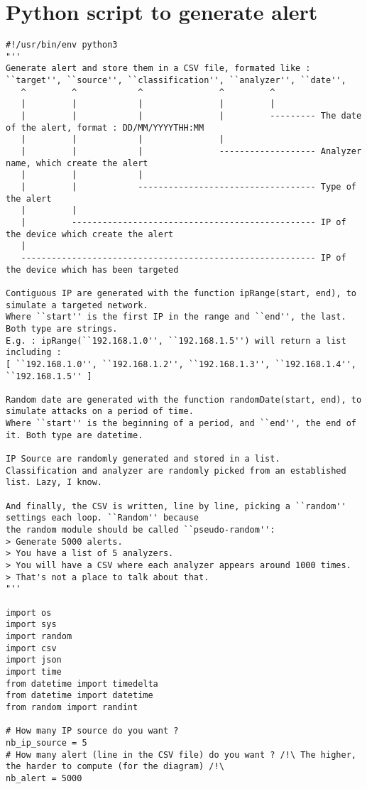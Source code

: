 \documentclass{koala-en}
\begin{document}
\section{Python script to generate alert}
\begin{lstlisting}
#!/usr/bin/env python3
"''
Generate alert and store them in a CSV file, formated like :
``target'', ``source'', ``classification'', ``analyzer'', ``date'',
   ^         ^            ^               ^         ^
   |         |            |               |         |
   |         |            |               |         --------- The date of the alert, format : DD/MM/YYYYTHH:MM
   |         |            |               |
   |         |            |               ------------------- Analyzer name, which create the alert
   |         |            |
   |         |            ----------------------------------- Type of the alert
   |         |
   |         ------------------------------------------------ IP of the device which create the alert
   |
   ---------------------------------------------------------- IP of the device which has been targeted

Contiguous IP are generated with the function ipRange(start, end), to simulate a targeted network.
Where ``start'' is the first IP in the range and ``end'', the last. Both type are strings.
E.g. : ipRange(``192.168.1.0'', ``192.168.1.5'') will return a list including :
[ ``192.168.1.0'', ``192.168.1.2'', ``192.168.1.3'', ``192.168.1.4'', ``192.168.1.5'' ]

Random date are generated with the function randomDate(start, end), to simulate attacks on a period of time.
Where ``start'' is the beginning of a period, and ``end'', the end of it. Both type are datetime.

IP Source are randomly generated and stored in a list.
Classification and analyzer are randomly picked from an established list. Lazy, I know.

And finally, the CSV is written, line by line, picking a ``random'' settings each loop. ``Random'' because
the random module should be called ``pseudo-random'':
> Generate 5000 alerts.
> You have a list of 5 analyzers.
> You will have a CSV where each analyzer appears around 1000 times.
> That's not a place to talk about that.
"''

import os
import sys
import random
import csv
import json
import time
from datetime import timedelta
from datetime import datetime
from random import randint

# How many IP source do you want ?
nb_ip_source = 5
# How many alert (line in the CSV file) do you want ? /!\ The higher, the harder to compute (for the diagram) /!\
nb_alert = 5000


\end{lstlisting}
\end{document}
